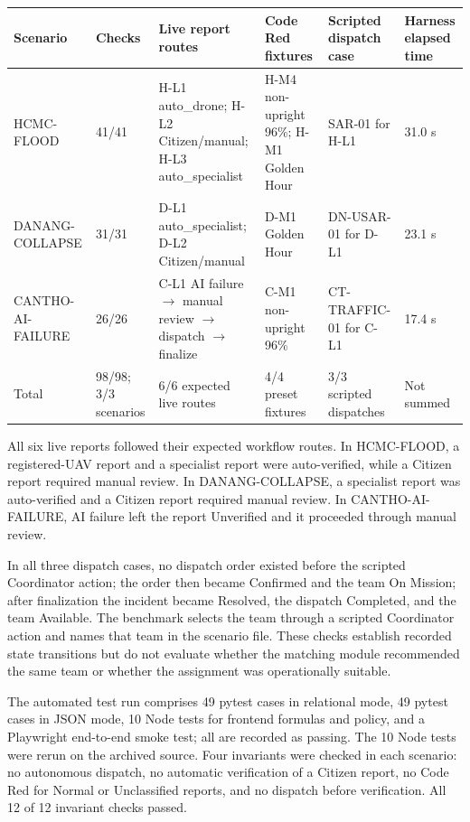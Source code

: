 \documentclass[pdflatex,sn-mathphys-ay]{sn-jnl}
\begin{document}
\begin{center}
\small
\renewcommand{\arraystretch}{1.15}
\setlength{\tabcolsep}{3pt}
\begin{tabularx}{\textwidth}{|X|X|X|X|X|X|}\hline
Scenario & Checks & Live report routes & Code Red fixtures & Scripted dispatch case & Harness elapsed time \\ \hline
HCMC-FLOOD & 41/41 & H-L1 auto\_drone; H-L2 Citizen/manual; H-L3 auto\_specialist & H-M4 non-upright 96\%; H-M1 Golden Hour & SAR-01 for H-L1 & 31.0 s \\ \hline
DANANG-COLLAPSE & 31/31 & D-L1 auto\_specialist; D-L2 Citizen/manual & D-M1 Golden Hour & DN-USAR-01 for D-L1 & 23.1 s \\ \hline
CANTHO-AI-FAILURE & 26/26 & C-L1 AI failure $\rightarrow$ manual review $\rightarrow$ dispatch $\rightarrow$ finalize & C-M1 non-upright 96\% & CT-TRAFFIC-01 for C-L1 & 17.4 s \\ \hline
Total & 98/98; 3/3 scenarios & 6/6 expected live routes & 4/4 preset fixtures & 3/3 scripted dispatches & Not summed \\ \hline
\end{tabularx}
\end{center}

All six live reports followed their expected workflow routes. In HCMC-FLOOD, a registered-UAV report and a specialist report were auto-verified, while a Citizen report required manual review. In DANANG-COLLAPSE, a specialist report was auto-verified and a Citizen report required manual review. In CANTHO-AI-FAILURE, AI failure left the report Unverified and it proceeded through manual review.

In all three dispatch cases, no dispatch order existed before the scripted Coordinator action; the order then became Confirmed and the team On Mission; after finalization the incident became Resolved, the dispatch Completed, and the team Available. The benchmark selects the team through a scripted Coordinator action and names that team in the scenario file. These checks establish recorded state transitions but do not evaluate whether the matching module recommended the same team or whether the assignment was operationally suitable.

The automated test run comprises 49 pytest cases in relational mode, 49 pytest cases in JSON mode, 10 Node tests for frontend formulas and policy, and a Playwright end-to-end smoke test; all are recorded as passing. The 10 Node tests were rerun on the archived source. Four invariants were checked in each scenario: no autonomous dispatch, no automatic verification of a Citizen report, no Code Red for Normal or Unclassified reports, and no dispatch before verification. All 12 of 12 invariant checks passed.
\end{document}
